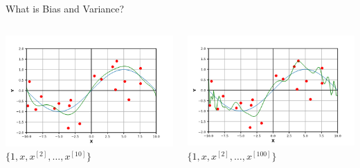\begin{frame}{What is Bias and Variance?}
\begin{columns}
    \begin{center}
        \includegraphics[width=0.95\linewidth]{images/linear-regression/linear-regression-16.png} \\
        $\{1, x, x^{[2]}, \dots, x^{[10]}\}$
    \end{center}
    
    \begin{center}
        \includegraphics[width=0.95\linewidth]{images/linear-regression/linear-regression-17.png} \\
        $\{1, x, x^{[2]}, \dots, x^{[100]}\}$
    \end{center}
\end{columns}

\end{frame}


